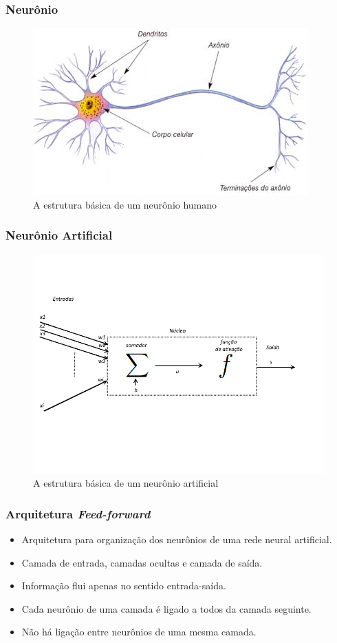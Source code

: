 \documentclass{beamer}
\begin{document}
\begin{frame}
\frametitle{Neurônio}
\begin{figure}
\centering
\includegraphics[width=.6\textwidth]{neuronio}
\caption{A estrutura básica de um neurônio humano}
\end{figure}
\end{frame}

\begin{frame}
\frametitle{Neurônio Artificial}
\begin{figure}
\centering
\includegraphics[width=.6\textwidth]{NeuronioArtificial}
\caption{A estrutura básica de um neurônio artificial}
\end{figure}
\end{frame}

\begin{frame}
\frametitle{Arquitetura \textit{Feed-forward}}
\begin{itemize}
\item Arquitetura para organização dos neurônios de uma rede neural artificial.
\item Camada de entrada, camadas ocultas e camada de saída.
\item Informação flui apenas no sentido entrada-saída.
\item Cada neurônio de uma camada é ligado a todos da camada seguinte.
\item Não há ligação entre neurônios de uma mesma camada.
\end{itemize}
\end{frame}
\end{document}
